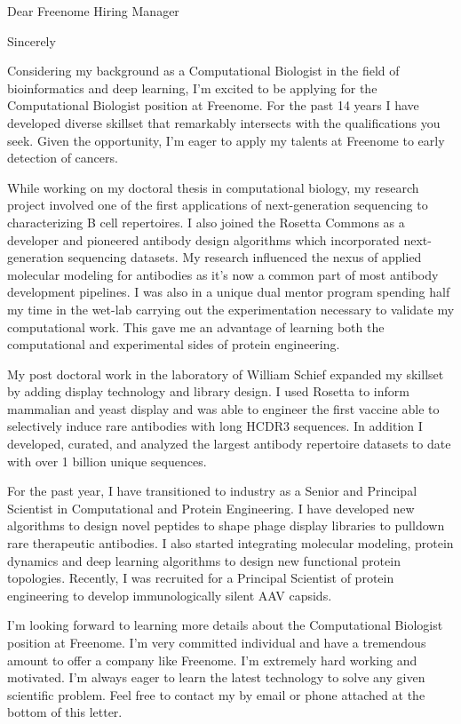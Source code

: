 \documentclass[11pt,a4paper,sans]{moderncv}        %
\title{}                               %
\begin{document}
\date{2020}
\opening{Dear Freenome Hiring Manager}
\closing{Sincerely}
\makelettertitle


Considering my background as a Computational Biologist in the field of bioinformatics and deep learning, I'm excited to be applying for the
Computational Biologist position at Freenome. 
For the past 14 years I have developed diverse skillset that remarkably intersects with the qualifications you seek. Given the opportunity, 
I'm eager to apply my talents at Freenome to early detection of cancers.

\vspace{0.1in}
While working on my doctoral thesis in computational biology, my research project involved one of the first applications of next-generation 
sequencing to characterizing B cell repertoires. 
I also joined the Rosetta Commons as a developer and pioneered antibody design algorithms which incorporated next-generation sequencing datasets. My research influenced the nexus of applied molecular modeling for antibodies as it's now a common part of most antibody development pipelines. I was also in a unique dual 
mentor program spending half my time in the wet-lab carrying out the experimentation necessary to validate my computational work. This gave me an advantage 
of learning both the computational and experimental sides of protein engineering.

\vspace{0.1in}
My post doctoral work in the laboratory of William Schief expanded my skillset by adding display technology and library design. I used Rosetta to inform 
mammalian and yeast 
display and was able to engineer the first vaccine able to selectively induce rare antibodies with long HCDR3 sequences.  In addition I developed, curated, and analyzed the largest antibody 
repertoire datasets to date with over 1 billion unique sequences.

For the past year, I have transitioned to industry as a 
Senior and Principal Scientist in Computational and Protein Engineering. I have developed new algorithms to design novel peptides to shape phage display libraries to pulldown rare therapeutic antibodies.
I also started integrating molecular modeling, protein dynamics and deep learning algorithms to design new functional protein topologies. Recently, I was recruited for a Principal Scientist of protein engineering to develop immunologically silent AAV capsids. 


\vspace{0.1in}
I’m looking forward to learning more details about the Computational Biologist position at Freenome. I'm very committed individual and have a tremendous amount
 to offer a company like Freenome. I'm extremely hard working and motivated. I'm always eager to learn the latest technology to solve any given scientific problem. 
Feel free to contact my by email or phone attached at the bottom of this letter. 

\makeletterclosing
\end{document}
